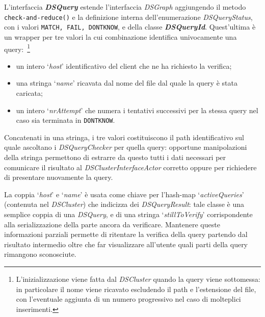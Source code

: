 L'interfaccia \textbf{\emph{DSQuery}} estende l'interfaccia
\emph{DSGraph} aggiungendo il metodo \texttt{check-and-reduce()} e la
definizione interna dell'enumerazione \emph{DSQueryStatus},
con i valori \texttt{MATCH, FAIL, DONTKNOW}, e della classe
\textbf{\emph{DSQueryId}}.
Quest'ultima è un wrapper per tre valori la cui
combinazione identifica univocamente una query:~\footnote{
    L'inizializzazione viene fatta dal \emph{DSCluster} quando la
    query viene sottomessa: in particolare il nome viene ricavato
    escludendo il path e l'estensione del file, con l'eventuale
    aggiunta di un numero progressivo nel caso di molteplici
    inserimenti.}
\begin{itemize}
\item un intero `\emph{host}' identificativo del client che ne ha
  richiesto la verifica;
\item una stringa `\emph{name}' ricavata dal nome del file dal quale
  la query è stata caricata;
\item un intero `\emph{nrAttempt}' che numera i tentativi successivi
  per la stessa query nel caso sia terminata in \texttt{DONTKNOW}.
\end{itemize}
Concatenati in una stringa, i tre valori costituiscono il path
identificativo sul quale ascoltano i \emph{DSQueryChecker}
per quella query: opportune manipolazioni della stringa permettono
di estrarre da questo tutti i dati necessari per comunicare
il risultato al \emph{DSClusterInterfaceActor} corretto oppure
per richiedere di presentare nuovamente la query.

La coppia `\emph{host}' e `\emph{name}' è usata come chiave
per l'hash-map `\emph{activeQueries}' (contenuta nel \emph{DSCluster})
che indicizza dei \emph{DSQueryResult}: tale classe è una semplice
coppia di una \emph{DSQuery}, e di una stringa `\emph{stillToVerify}'
corrispondente alla serializzazione della parte ancora da verificare.
Mantenere queste informazioni parziali permette di ritentare la
verifica della query partendo dal risultato intermedio oltre che
far visualizzare all'utente quali parti della query
rimangono sconosciute.\\

